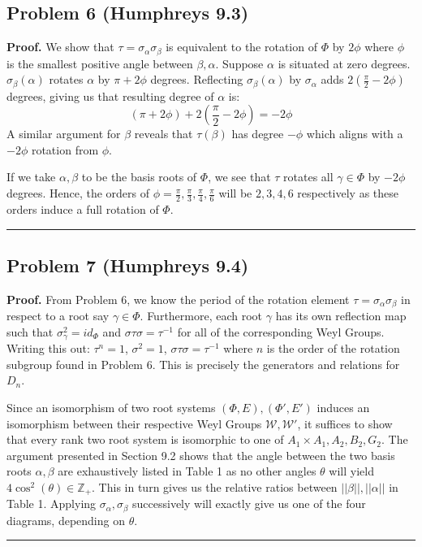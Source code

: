 \documentclass[12pt]{article}%
\newenvironment{proof}[1][Proof]{\textbf{#1.} }{\ \rule{0.5em}{0.5em}}
\begin{document}
\subsection*{Problem 6 (Humphreys 9.3)}
\begin{proof}
  We show that $\tau = \sigma_{\alpha}\sigma_{\beta}$ is equivalent to the rotation of $\Phi$ by $2\phi$ where $\phi$ is the smallest positive angle between $\beta,\alpha$.
  Suppose $\alpha$ is situated at zero degrees. $\sigma_{\beta}(\alpha)$ rotates $\alpha$ by $\pi + 2\phi$ degrees. Reflecting $\sigma_{\beta}(\alpha)$ by $\sigma_{\alpha}$ adds $2(\frac{\pi}{2} - 2\phi)$ degrees, giving us that resulting degree of $\alpha$ is:
  $$(\pi + 2\phi) + 2(\frac{\pi}{2} - 2\phi) = -2\phi $$
  A similar argument for $\beta$ reveals that $\tau(\beta)$ has degree $-\phi$ which aligns with a $-2\phi$ rotation from $\phi$.

  If we take $\alpha,\beta$ to be the basis roots of $\Phi$, we see that $\tau$ rotates all $\gamma \in \Phi$ by $-2\phi$ degrees. Hence, the orders of $\phi = \frac{\pi}{2},\frac{\pi}{3},\frac{\pi}{4},\frac{\pi}{6}$ will be $2,3,4,6$ respectively as these orders induce a full rotation of $\Phi$. \end{proof}

\subsection*{Problem 7 (Humphreys 9.4)}
\begin{proof}
From Problem 6, we know the period of the rotation element $\tau = \sigma_{\alpha}\sigma_{\beta}$ in respect to a root say $\gamma \in \Phi$. Furthermore, each root $\gamma$ has its own reflection map such that $\sigma_{\gamma}^2 = id_{\Phi}$ and $\sigma\tau\sigma = \tau^{-1}$ for all of the corresponding Weyl Groups. Writing this out: $\tau^n = 1$, $\sigma^2 = 1$, $\sigma\tau\sigma = \tau^{-1}$ where $n$ is the order of the rotation subgroup found in Problem 6. This is precisely the generators and relations for $D_n$.

Since an isomorphism of two root systems $(\Phi,E),(\Phi',E')$ induces an isomorphism between their respective Weyl Groups $\mathcal{W},\mathcal{W}'$, it suffices to show that every rank two root system is isomorphic to one of $A_1 \times A_1,A_2,B_2,G_2$. The argument presented in Section 9.2 shows that the angle between the two basis roots $\alpha,\beta$ are exhaustively listed in Table 1 as no other angles $\theta$ will yield $4\cos^2(\theta) \in \mathbb{Z}_+$. This in turn gives us the relative ratios between $||\beta||,||\alpha||$ in Table 1. Applying $\sigma_{\alpha},\sigma_{\beta}$ successively will exactly give us one of the four diagrams, depending on $\theta$. \end{proof}
\end{document}
